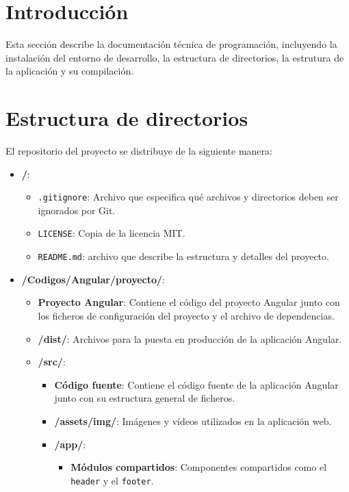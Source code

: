 
\section{Introducción}
Esta sección describe la documentación técnica de programación, incluyendo la instalación del entorno de desarrollo, la estructura de directorios, la estrutura de la aplicación y su compilación.
\section{Estructura de directorios}
El repositorio del proyecto se distribuye de la siguiente manera:

\begin{itemize}
    \item \textbf{/}:
    \begin{itemize}
        \item \texttt{.gitignore}: Archivo que especifica qué archivos y directorios deben ser ignorados por Git.
        \item \texttt{LICENSE}: Copia de la licencia MIT.
        \item \texttt{README.md}: archivo que describe la estructura y detalles del proyecto.
    \end{itemize}
    \item \textbf{/Codigos/Angular/proyecto/}:
    \begin{itemize}
        \item \textbf{Proyecto Angular}: Contiene el código del proyecto Angular junto con los ficheros de configuración del proyecto y el archivo de dependencias.
        \item \textbf{/dist/}: Archivos para la puesta en producción de la aplicación Angular.
        \item \textbf{/src/}:
        \begin{itemize}
            \item \textbf{Código fuente}: Contiene el código fuente de la aplicación Angular junto con su estructura general de ficheros.
            \item \textbf{/assets/img/}: Imágenes y vídeos utilizados en la aplicación web.
            \item \textbf{/app/}:
            \begin{itemize}
                \item \textbf{Módulos compartidos}: Componentes compartidos como el \texttt{header} y el \texttt{footer}.

\end{itemize}
\end{itemize}
\end{itemize}
\end{itemize}
